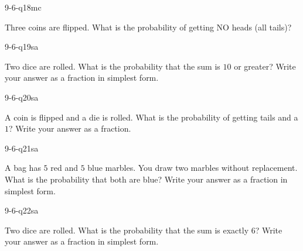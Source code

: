 \begin{practiceQuestion}{9-6-q18}{mc}
\begin{questionText}
Three coins are flipped. What is the probability of getting NO heads (all tails)?
\end{questionText}
\end{practiceQuestion}


\begin{practiceQuestion}{9-6-q19}{sa}
\begin{questionText}
Two dice are rolled. What is the probability that the sum is $10$ or greater? Write your answer as a fraction in simplest form.
\end{questionText}
\end{practiceQuestion}

\begin{practiceQuestion}{9-6-q20}{sa}
\begin{questionText}
A coin is flipped and a die is rolled. What is the probability of getting tails and a $1$? Write your answer as a fraction.
\end{questionText}
\end{practiceQuestion}

\begin{practiceQuestion}{9-6-q21}{sa}
\begin{questionText}
A bag has $5$ red and $5$ blue marbles. You draw two marbles without replacement. What is the probability that both are blue? Write your answer as a fraction in simplest form.
\end{questionText}
\end{practiceQuestion}

\begin{practiceQuestion}{9-6-q22}{sa}
\begin{questionText}
Two dice are rolled. What is the probability that the sum is exactly $6$? Write your answer as a fraction in simplest form.
\end{questionText}
\end{practiceQuestion}

